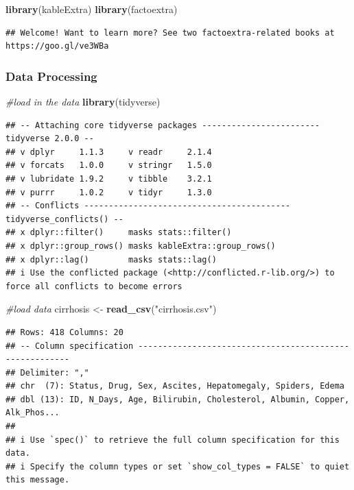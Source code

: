 \documentclass[
]{article}
\newenvironment{Shaded}{\begin{snugshade}}{\end{snugshade}}
\newcommand{\CommentTok}[1]{\textcolor[rgb]{0.56,0.35,0.01}{\textit{#1}}}
\newcommand{\FunctionTok}[1]{\textcolor[rgb]{0.13,0.29,0.53}{\textbf{#1}}}
\newcommand{\NormalTok}[1]{#1}
\newcommand{\OtherTok}[1]{\textcolor[rgb]{0.56,0.35,0.01}{#1}}
\newcommand{\StringTok}[1]{\textcolor[rgb]{0.31,0.60,0.02}{#1}}
\begin{document}
\begin{Shaded}
\begin{Highlighting}[]
\FunctionTok{library}\NormalTok{(kableExtra)}
\FunctionTok{library}\NormalTok{(factoextra)}
\end{Highlighting}
\end{Shaded}

\begin{verbatim}
## Welcome! Want to learn more? See two factoextra-related books at https://goo.gl/ve3WBa
\end{verbatim}

\hypertarget{data-processing}{%
\subsubsection{Data Processing}\label{data-processing}}

\begin{Shaded}
\begin{Highlighting}[]
\CommentTok{\#load in the data}
\FunctionTok{library}\NormalTok{(tidyverse)}
\end{Highlighting}
\end{Shaded}

\begin{verbatim}
## -- Attaching core tidyverse packages ------------------------ tidyverse 2.0.0 --
## v dplyr     1.1.3     v readr     2.1.4
## v forcats   1.0.0     v stringr   1.5.0
## v lubridate 1.9.2     v tibble    3.2.1
## v purrr     1.0.2     v tidyr     1.3.0
## -- Conflicts ------------------------------------------ tidyverse_conflicts() --
## x dplyr::filter()     masks stats::filter()
## x dplyr::group_rows() masks kableExtra::group_rows()
## x dplyr::lag()        masks stats::lag()
## i Use the conflicted package (<http://conflicted.r-lib.org/>) to force all conflicts to become errors
\end{verbatim}

\begin{Shaded}
\begin{Highlighting}[]
\CommentTok{\#load data}
\NormalTok{cirrhosis }\OtherTok{\textless{}{-}} \FunctionTok{read\_csv}\NormalTok{(}\StringTok{"cirrhosis.csv"}\NormalTok{)}
\end{Highlighting}
\end{Shaded}

\begin{verbatim}
## Rows: 418 Columns: 20
## -- Column specification --------------------------------------------------------
## Delimiter: ","
## chr  (7): Status, Drug, Sex, Ascites, Hepatomegaly, Spiders, Edema
## dbl (13): ID, N_Days, Age, Bilirubin, Cholesterol, Albumin, Copper, Alk_Phos...
## 
## i Use `spec()` to retrieve the full column specification for this data.
## i Specify the column types or set `show_col_types = FALSE` to quiet this message.
\end{verbatim}
\end{document}
